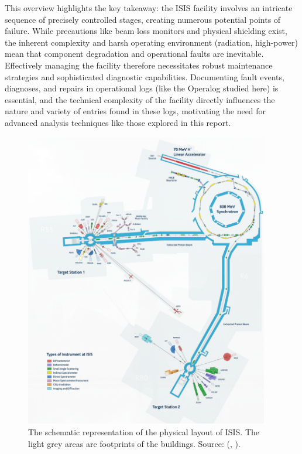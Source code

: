 \documentclass[10pt,oneside]{report}
\renewcommand{\citet}[1]{\citeauthor{#1}, \citeyear{#1}}
\begin{document}
\noindent This overview highlights the key takeaway: the ISIS facility involves an intricate sequence of precisely controlled stages, creating numerous potential points of failure. While precautions like beam loss monitors and physical shielding exist, the inherent complexity and harsh operating environment (radiation, high-power) mean that component degradation and operational faults are inevitable. Effectively managing the facility therefore necessitates robust maintenance strategies and sophisticated diagnostic capabilities. Documenting fault events, diagnoses, and repairs in operational logs (like the Operalog studied here) is essential, and the technical complexity of the facility directly influences the nature and variety of entries found in these logs, motivating the need for advanced analysis techniques like those explored in this report.

\begin{figure}[htbp]
    \centering
    \includegraphics[width=0.95\textwidth]{ISIS.png}
    \caption{The schematic representation of the physical layout of ISIS. The light grey areas are footprints of the buildings. Source: (\citet{thomason2019isis}).}\label{fig:isis}
\end{figure}
\end{document}
